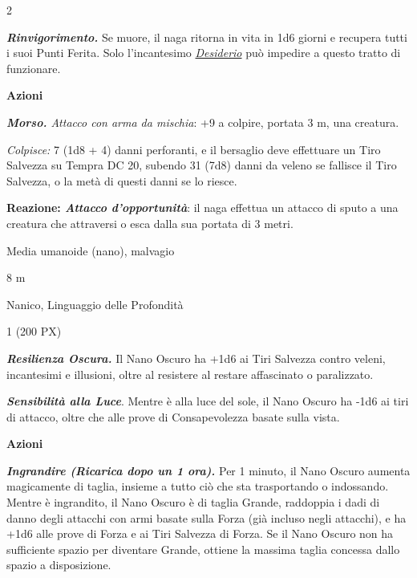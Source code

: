 \begin{multicols}{2}
{\emph{\textbf{Rinvigorimento.}} Se muore, il naga ritorna in vita in 1d6 giorni e recupera tutti i suoi Punti Ferita. Solo l'incantesimo \emph{\hyperlink{Desiderio}{Desiderio}} può impedire a questo tratto di funzionare.

\textbf{Azioni}

\emph{\textbf{Morso.} Attacco con arma da mischia}: +9 a colpire, portata 3 m, una creatura.

\emph{Colpisce:} 7 (1d8 + 4) danni perforanti, e il bersaglio deve effettuare un Tiro Salvezza su Tempra DC 20, subendo 31 (7d8) danni da veleno se fallisce il Tiro Salvezza, o la metà di questi danni se lo riesce.

\textbf{Reazione: \emph{Attacco d'opportunità}}: il naga effettua un attacco di sputo a una creatura che attraversi o esca dalla sua portata di 3 metri.

\begin{description}[noitemsep, topsep=0pt, parsep=0pt, partopsep=0pt, itemsep=1pt, leftmargin=2.35cm,  labelwidth=2.2cm, itemindent=0cm, listparindent=0pt] %
\setlength{\baselineskip}{10pt}
\item[\textbf{Taglia/Tipo}] Media umanoide (nano), malvagio
\item[\textbf{Caratt.}] 
\item[\textbf{Punti Ferita}] 
\item[\textbf{Movimento}] 8 m
\item[\textbf{Tiri Salvez.}] 
\item[\textbf{Sensi}] 
\item[\textbf{Linguaggi}] Nanico, Linguaggio delle Profondità
\item[\textbf{Sfida}] 1 (200 PX)
\end{description}
\smallskip

\emph{\textbf{Resilienza Oscura.}} Il Nano Oscuro ha +1d6 ai Tiri Salvezza contro veleni, incantesimi e illusioni, oltre al resistere al restare affascinato o paralizzato.

\emph{\textbf{Sensibilità alla Luce}}. Mentre è alla luce del sole, il Nano Oscuro ha -1d6 ai tiri di attacco, oltre che alle prove di Consapevolezza basate sulla vista.

\textbf{Azioni}

\emph{\textbf{Ingrandire (Ricarica dopo un 1 ora).}} Per 1 minuto, il Nano Oscuro aumenta magicamente di taglia, insieme a tutto ciò che sta trasportando o indossando. Mentre è ingrandito, il Nano Oscuro è di taglia Grande, raddoppia i dadi di danno degli attacchi con armi basate sulla Forza (già incluso negli attacchi), e ha +1d6 alle prove di Forza e ai Tiri Salvezza di Forza. Se il Nano Oscuro non ha sufficiente spazio per diventare Grande, ottiene la massima taglia concessa dallo spazio a disposizione.

}
\end{multicols}
